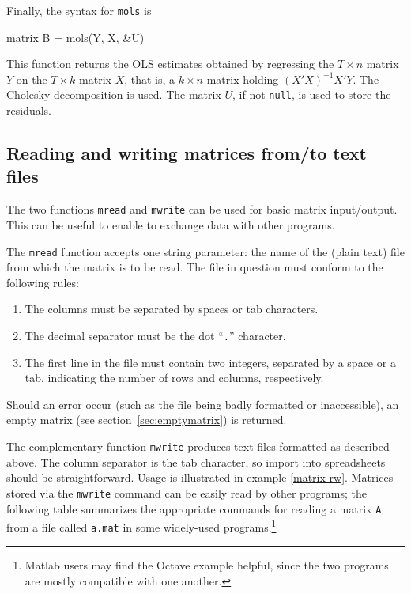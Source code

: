 Finally, the syntax for \texttt{mols} is
%
\begin{code}
matrix B = mols(Y, X, &U)
\end{code}
%
This function returns the OLS estimates obtained by regressing the $T
\times n$ matrix $Y$ on the $T \times k$ matrix $X$, that is, a $k
\times n$ matrix holding $(X'X)^{-1} X'Y$. The Cholesky decomposition
is used. The matrix $U$, if not \texttt{null}, is used to store the
residuals.

\subsection{Reading and writing matrices from/to text files}
\label{matrix-csv}

The two functions \texttt{mread} and \texttt{mwrite} can be used for
basic matrix input/output. This can be useful to enable  to
exchange data with other programs.

The \texttt{mread} function accepts one string parameter: the name of
the (plain text) file from which the matrix is to be read.  The file
in question must conform to the following rules:
%
\begin{enumerate}
\item The columns must be separated by spaces or tab characters.
\item The decimal separator must be the dot ``\texttt{.}'' character.
\item The first line in the file must contain two integers, separated
  by a space or a tab, indicating the number of rows and columns,
  respectively.
\end{enumerate}

Should an error occur (such as the file being badly formatted or
inaccessible), an empty matrix (see section~\ref{sec:emptymatrix}) is
returned.

The complementary function \texttt{mwrite} produces text files
formatted as described above.  The column separator is the tab
character, so import into spreadsheets should be straightforward.
Usage is illustrated in example \ref{matrix-rw}.  Matrices stored via
the \texttt{mwrite} command can be easily read by other programs; the
following table summarizes the appropriate commands for reading a
matrix \texttt{A} from a file called \texttt{a.mat} in some
widely-used programs.\footnote{Matlab users may find the Octave
  example helpful, since the two programs are mostly compatible with one
  another.}

